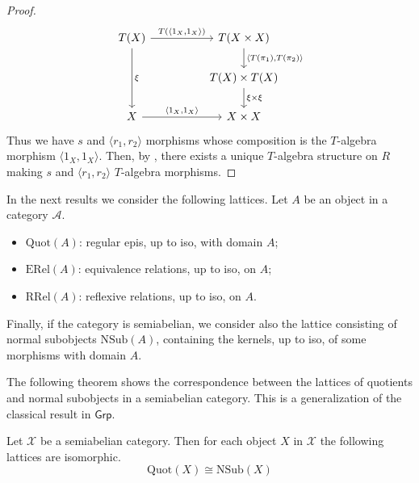 \begin{subbox}{}
\begin{proof}
\[\begin{tikzcd}
T(X) \arrow[dd, "\xi"] \arrow[rr, "{T(\langle1_X,1_X \rangle)}"] &  & T(X\times X) \arrow[d, "{\langle T(\pi_1), T(\pi_2)\rangle}"] \\
                                                                 &  & T(X)\times T(X) \arrow[d, "\xi \times \xi"]                   \\
X \arrow[rr, "{\langle1_X,1_X \rangle}"]                         &  & X\times X                                                    
\end{tikzcd}
\]
Thus we have $s$ and $\langle r_1,r_2 \rangle$ morphisms whose composition is the $T$-algebra morphism $\langle 1_X,1_X \rangle$. Then, by , there exists a unique $T$-algebra structure on $R$ making $s$ and $\langle r_1,r_2 \rangle$ $T$-algebra morphisms.
    \end{proof}
\end{subbox}

In the next results we consider the following lattices. Let $A$ be an object in a category $\mathcal{A}$.
\begin{itemize}[itemsep=1.5ex]
    \item $\mathrm{Quot}(A)$: regular epis, up to iso, with domain $A$;
    \item $\mathrm{ERel}(A)$: equivalence relations, up to iso, on $A$;
    \item $\mathrm{RRel}(A)$: reflexive relations, up to iso, on $A$.
\end{itemize}

Finally, if the category is semiabelian, we consider also the lattice consisting of normal subobjects $\mathrm{NSub}(A)$, containing the kernels, up to iso, of some morphisms with domain $A$.

The following theorem shows the correspondence between the lattices of quotients and normal subobjects in a semiabelian category. This is a generalization of the classical result in $\mathsf{Grp}$.

\begin{mainbox}{}
\begin{theo}\label{quotients in semiabelian}
    Let $\mathcal{X}$ be a semiabelian category. Then for each object $X$ in $\mathcal{X}$ the following lattices are isomorphic.
    \[\mathrm{Quot}(X) \cong \mathrm{NSub}(X)\]
\end{theo}
\end{mainbox}

